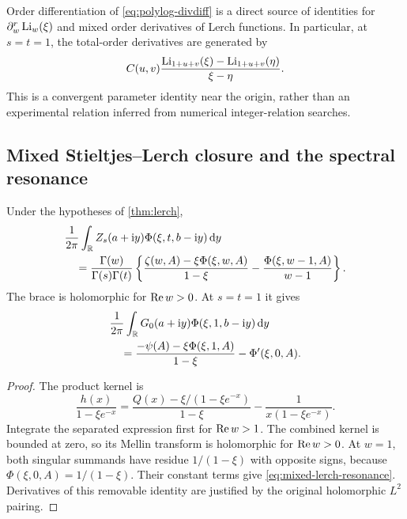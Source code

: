 Order differentiation of \eqref{eq:polylog-divdiff} is a direct source of
identities for $\partial_w^r\operatorname{Li}_w(\xi)$ and mixed order derivatives of
Lerch functions. In particular, at $s=t=1$, the total-order derivatives
are generated by
\[
 C(u,v)\frac{\operatorname{Li}_{1+u+v}(\xi)-\operatorname{Li}_{1+u+v}(\eta)}{\xi-\eta}.
\]
This is a convergent parameter identity near the origin, rather than an
experimental relation inferred from numerical integer-relation searches.

\subsection{Mixed Stieltjes--Lerch closure and the spectral resonance}
\begin{theorem}\label{thm:mixed-lerch}
Under the hypotheses of \cref{thm:lerch},
\begin{align}
 &\frac1{2\pi}\int_{\mathbb R}Z_s(a+\mathrm i y)\Phi(\xi,t,b-\mathrm i y)\,\mathrm d y\notag\\
 &\quad=\frac{\Gamma(w)}{\Gamma(s)\Gamma(t)}
  \left\{\frac{\zeta(w,A)-\xi\Phi(\xi,w,A)}{1-\xi}
                     -\frac{\Phi(\xi,w-1,A)}{w-1}\right\}.
                         \label{eq:mixed-lerch}
\end{align}
The brace is holomorphic for $\operatorname{Re} w>0$. At $s=t=1$ it gives
\begin{align}
 &\frac1{2\pi}\int_{\mathbb R}G_0(a+\mathrm i y)\Phi(\xi,1,b-\mathrm i y)\,\mathrm d y\notag\\
 &\quad=\frac{-\psi(A)-\xi\Phi(\xi,1,A)}{1-\xi}
                                  -\Phi'(\xi,0,A).
                                      \label{eq:mixed-lerch-resonance}
\end{align}
\end{theorem}
\begin{proof}
The product kernel is
\[
 \frac{h(x)}{1-\xi e^{-x}}
 =\frac{Q(x)-\xi/(1-\xi e^{-x})}{1-\xi}
                     -\frac1{x(1-\xi e^{-x})}.
\]
Integrate the separated expression first for $\operatorname{Re} w>1$.
The combined kernel is bounded at zero, so its Mellin transform is
holomorphic for $\operatorname{Re} w>0$. At $w=1$, both singular summands have residue
$1/(1-\xi)$ with opposite signs, because
$\Phi(\xi,0,A)=1/(1-\xi)$. Their constant terms give
\eqref{eq:mixed-lerch-resonance}. Derivatives of this removable identity
are justified by the original holomorphic $L^2$ pairing.
\end{proof}

